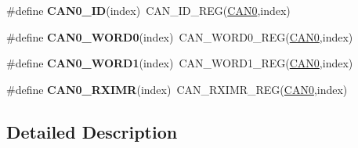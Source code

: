 \begin{DoxyCompactItemize}
\item 
\#define {\bfseries C\+A\+N0\+\_\+\+ID}(index)~C\+A\+N\+\_\+\+I\+D\+\_\+\+R\+EG(\hyperlink{group__CAN__Peripheral__Access__Layer_ga8882ee5d18ec64b8193396ec6bc66fe5}{C\+A\+N0},index)\hypertarget{group__CAN__Register__Accessor__Macros_gae8a61f3c3f89b9486c37cbf92c9542bf}{}\label{group__CAN__Register__Accessor__Macros_gae8a61f3c3f89b9486c37cbf92c9542bf}

\item 
\#define {\bfseries C\+A\+N0\+\_\+\+W\+O\+R\+D0}(index)~C\+A\+N\+\_\+\+W\+O\+R\+D0\+\_\+\+R\+EG(\hyperlink{group__CAN__Peripheral__Access__Layer_ga8882ee5d18ec64b8193396ec6bc66fe5}{C\+A\+N0},index)\hypertarget{group__CAN__Register__Accessor__Macros_gabf04bc963948f24928e990ebb683fd15}{}\label{group__CAN__Register__Accessor__Macros_gabf04bc963948f24928e990ebb683fd15}

\item 
\#define {\bfseries C\+A\+N0\+\_\+\+W\+O\+R\+D1}(index)~C\+A\+N\+\_\+\+W\+O\+R\+D1\+\_\+\+R\+EG(\hyperlink{group__CAN__Peripheral__Access__Layer_ga8882ee5d18ec64b8193396ec6bc66fe5}{C\+A\+N0},index)\hypertarget{group__CAN__Register__Accessor__Macros_ga0a1269cd4f0ca08584208ed1988ee733}{}\label{group__CAN__Register__Accessor__Macros_ga0a1269cd4f0ca08584208ed1988ee733}

\item 
\#define {\bfseries C\+A\+N0\+\_\+\+R\+X\+I\+MR}(index)~C\+A\+N\+\_\+\+R\+X\+I\+M\+R\+\_\+\+R\+EG(\hyperlink{group__CAN__Peripheral__Access__Layer_ga8882ee5d18ec64b8193396ec6bc66fe5}{C\+A\+N0},index)\hypertarget{group__CAN__Register__Accessor__Macros_gae42ef907bb078d24fcbc14fa1be37105}{}\label{group__CAN__Register__Accessor__Macros_gae42ef907bb078d24fcbc14fa1be37105}

\end{DoxyCompactItemize}


\subsection{Detailed Description}
